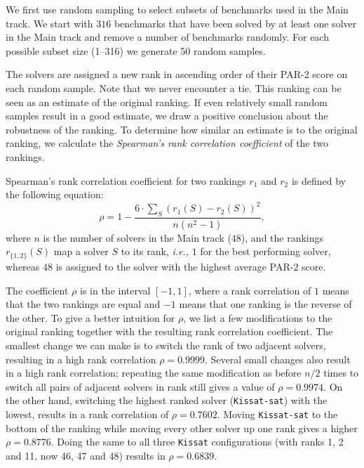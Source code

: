 \documentclass{elsarticle}
\newcommand{\solver}[1]{\texttt{#1}}
\begin{document}
We first use random sampling to select subsets of benchmarks used in the Main track.
We start with $316$ benchmarks that have been solved by at least one solver in
the Main track and remove a number of benchmarks randomly. For each
possible subset size (1--316) we generate 50 random samples.

The solvers are assigned a new rank in ascending order of their PAR-2 score on
each random sample. Note that we never encounter a tie. This ranking can be
seen as an estimate of the original ranking.
If even relatively small random samples result in a good estimate, we draw a
positive conclusion about the robustness of the ranking.
To determine how similar an estimate is to the original ranking, we calculate
the \emph{Spearman's rank correlation coefficient} of the two rankings.

Spearman's rank correlation coefficient
for two rankings $r_{1}$ and $r_{2}$
is defined by the following equation:
\[
    \rho = 1 - \frac{6\cdot\sum_{S}{(r_{1}(S) - r_{2}(S))^2}}{n(n^2-1)},
\]
where $n$ is the number of solvers in the Main track ($48$), and the rankings
$r_{\{1,2\}}(S)$ map a solver $S$ to its rank, \emph{i.e.,} $1$ for the best
performing solver, whereas $48$ is assigned to the solver
with the highest average PAR-2 score.

The coefficient $\rho$ is in the interval $[-1, 1]$, where a rank correlation of
$1$ means that the two rankings are equal and $-1$ means that one ranking is the
reverse of the other. To give a better intuition for $\rho$, we list a few
modifications to the original ranking together with the resulting rank
correlation coefficient. The smallest change we can make is to switch the rank
of two adjacent solvers, resulting in a high rank correlation $\rho = 0.9999$.
Several small changes also result in a high rank correlation; repeating the same
modification as before $n/2$ times to switch all pairs of adjacent solvers in
rank still gives a value of $\rho = 0.9974$. On the other hand, switching the
highest ranked solver (\solver{Kissat-sat}) with the lowest,
results in a rank correlation of $\rho = 0.7602$. Moving \solver{Kissat-sat} to
the bottom of the ranking while moving every other solver up one rank gives a
higher $\rho = 0.8776$. Doing the same to all three \solver{Kissat}
configurations (with ranks 1, 2 and 11, now 46, 47 and 48) results in
$\rho = 0.6839$.
\end{document}
